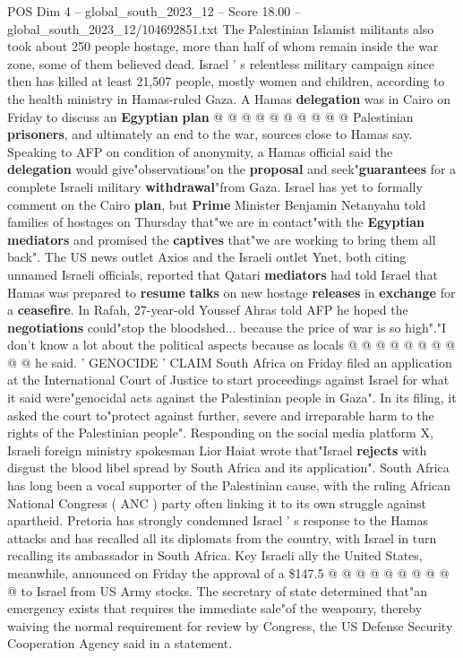 \begin{textsample}{POS Dim 4 – global\_south\_2023\_12 – Score 18.00 – global\_south\_2023\_12/104692851.txt}
The Palestinian Islamist militants also took about 250 people hostage, more than half of whom remain inside the war zone, some of them believed dead.
Israel ' s relentless military campaign since then has killed at least 21,507 people, mostly women and children, according to the health ministry in Hamas-ruled Gaza.
A Hamas \textbf{delegation} was in Cairo on Friday to discuss an \textbf{Egyptian} \textbf{plan} @ @ @ @ @ @ @ @ @ @ Palestinian \textbf{prisoners}, and ultimately an end to the war, sources close to Hamas say.
Speaking to AFP on condition of anonymity, a Hamas official said the \textbf{delegation} would give"observations"on the \textbf{proposal} and seek"\textbf{guarantees} for a complete Israeli military \textbf{withdrawal}"from Gaza.
Israel has yet to formally comment on the Cairo \textbf{plan}, but \textbf{Prime} Minister Benjamin Netanyahu told families of hostages on Thursday that"we are in contact"with the \textbf{Egyptian} \textbf{mediators} and promised the \textbf{captives} that"we are working to bring them all back".
The US news outlet Axios and the Israeli outlet Ynet, both citing unnamed Israeli officials, reported that Qatari \textbf{mediators} had told Israel that Hamas was prepared to \textbf{resume} \textbf{talks} on new hostage \textbf{releases} in \textbf{exchange} for a \textbf{ceasefire}.
In Rafah, 27-year-old Youssef Ahras told AFP he hoped the \textbf{negotiations} could"stop the bloodshed... because the price of war is so high"."I don't know a lot about the political aspects because as locals @ @ @ @ @ @ @ @ @ @ he said. ' GENOCIDE ' CLAIM South Africa on Friday filed an application at the International Court of Justice to start proceedings against Israel for what it said were"genocidal acts against the Palestinian people in Gaza".
In its filing, it asked the court to"protect against further, severe and irreparable harm to the rights of the Palestinian people".
Responding on the social media platform X, Israeli foreign ministry spokesman Lior Haiat wrote that"Israel \textbf{rejects} with disgust the blood libel spread by South Africa and its application".
South Africa has long been a vocal supporter of the Palestinian cause, with the ruling African National Congress ( ANC ) party often linking it to its own struggle against apartheid.
Pretoria has strongly condemned Israel ' s response to the Hamas attacks and has recalled all its diplomats from the country, with Israel in turn recalling its ambassador in South Africa.
Key Israeli ally the United States, meanwhile, announced on Friday the approval of a \$147.5 @ @ @ @ @ @ @ @ @ @ to Israel from US Army stocks.
The secretary of state determined that"an emergency exists that requires the immediate sale"of the weaponry, thereby waiving the normal requirement for review by Congress, the US Defense Security Cooperation Agency said in a statement.

\end{textsample}
